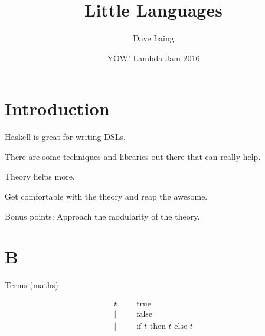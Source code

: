 \documentclass[aspectration=169]{beamer}
\title{Little Languages}
\author{Dave Laing}
\date{YOW! Lambda Jam 2016}
\begin{document}
\begin{frame}
\maketitle
\end{frame}

\section{Introduction}

\begin{frame}[c]
  \begin{center}
    Haskell is great for writing DSLs.
  \end{center}
\end{frame}

\begin{frame}[c]
  \begin{center}
    There are some techniques and libraries out there that can really help.
  \end{center}
\end{frame}

\begin{frame}[c]
  \begin{center}
    Theory helps more.
  \end{center}
\end{frame}

\begin{frame}[c]
  \begin{center}
    Get comfortable with the theory and reap the awesome.
  \end{center}
\end{frame}

\begin{frame}[c]
  \begin{center}
   Bonus points: Approach the modularity of the theory. 
  \end{center}
\end{frame}

\section{B}

\begin{frame}[c]
  \begin{center}
Terms (maths)
  \end{center}
  \begin{displaymath}
    \begin{aligned}
t =& \ \text{true} \\
  |& \ \text{false}  \\
  |& \ \text{if $t$ then $t$ else $t$}
    \end{aligned}
  \end{displaymath}
\end{frame}
\end{document}

